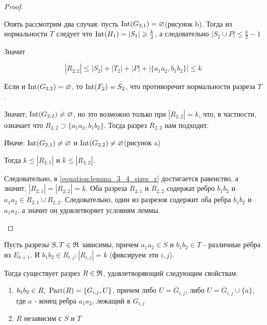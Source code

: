 \begin{proof}
\begin{enumerate}
Опять рассмотрим два случая:
пусть $\operatorname{Int}(G_{2,1}) = \varnothing$(рисунок b).
Тогда из нормальности $T$ следует что  $\operatorname{Int}(H_1) = |S_1| \geqslant \frac k 2$, а следовательно $|S_2 \cup P| \leqslant \frac{k}{2} - 1$ 

Значит

 \[
	 |R_{2,2}| \leqslant |S_2| + |T_2| + |P| + |\{a_1a_2, b_1b_2\}| \leqslant k
\] 

Если и $\operatorname{Int}(G_{2,2}) = \varnothing$, то  $\operatorname{Int}(F_2) = S_2$, что противоречит нормальности разреза $T$.

Значит,  $\operatorname{Int}(G_{2,2}) \neq \varnothing$, но это возможно только при  $|R_{2,2}| = k$, что, в частности, означает что  $R_{2,2} \supset \{a_1a_2, b_1b_2\}$.
Тогда разрез $R_{2,2}$ нам подходит.

Иначе: $\operatorname{Int}(G_{2,1}) \neq \varnothing$ и  $\operatorname{Int}(G_{2,2}) \neq \varnothing$(рисунок a)

Тогда  $k \leqslant |R_{2,1}|$ и  $k \leqslant |R_{2,2}|$.

Следовательно, в \eqref{equation:lemma_3_4_sizes_r} достигается равенство, а значит,  $|R_{2,1}| = |R_{2,2}| = k$.
Оба разреза  $R_{2,1}$ и  $R_{2,2}$ содержат ребро  $b_1b_2$ и $a_1a_2 \in R_{2,1} \cup R_{2,2}$.
Следовательно, один из разрезов содержит оба ребра $b_1b_2$ и $a_1a_2$, а значит он удовлетворяет условиям леммы.

	\end{enumerate}

\end{proof}

\begin{customlm}{3.5} \label{lemma:3_5}
	Пусть разрезы $S, T \in \mathfrak{R}$ зависимы, причем  $a_1a_2 \in S$ и $b_1b_2 \in T$ - различные рёбра из $E_{k+1}$.
	И  $b_1b_2 \in R_{i,j} \colon |R_{i, j}| = k$ (фиксируем эти $i, j$).

	Тогда существует разрез $R \in \mathfrak{R}$, удовлетворяющий следующим свойствам:

	\begin{enumerate}
		\item $b_1b_2 \in R, \ \operatorname{Part}(R) = \{G_{i, j}, U\}$, причем либо $U = \overline G_{i, j}$, либо  $U = \overline G_{i, j} \cup \{a\}$, где  $a$ - конец ребра  $a_1a_2$, лежащий в $G_{i, j}$
		\item  $R$ независим с  $S$ и  $T$
	\end{enumerate}

\end{customlm}

